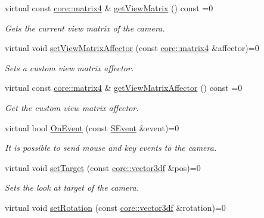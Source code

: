 \begin{DoxyCompactItemize}
virtual const \hyperlink{namespaceirr_1_1core_a73fa92e638c5ca97efd72da307cc9b65}{core\+::matrix4} \& \hyperlink{classirr_1_1scene_1_1ICameraSceneNode_aef40bb2f8f4a95a66dbb7fc3abee3e49}{get\+View\+Matrix} () const =0
\begin{DoxyCompactList}\small\item\em Gets the current view matrix of the camera. \end{DoxyCompactList}\item 
virtual void \hyperlink{classirr_1_1scene_1_1ICameraSceneNode_adb3500cac2a8a47e6a3f48aa343ce2fd}{set\+View\+Matrix\+Affector} (const \hyperlink{namespaceirr_1_1core_a73fa92e638c5ca97efd72da307cc9b65}{core\+::matrix4} \&affector)=0
\begin{DoxyCompactList}\small\item\em Sets a custom view matrix affector. \end{DoxyCompactList}\item 
virtual const \hyperlink{namespaceirr_1_1core_a73fa92e638c5ca97efd72da307cc9b65}{core\+::matrix4} \& \hyperlink{classirr_1_1scene_1_1ICameraSceneNode_a033018cccdb26f94cc33256e23d764c6}{get\+View\+Matrix\+Affector} () const =0
\begin{DoxyCompactList}\small\item\em Get the custom view matrix affector. \end{DoxyCompactList}\item 
virtual bool \hyperlink{classirr_1_1scene_1_1ICameraSceneNode_af27145518f43a17f803cdea086f68f3c}{On\+Event} (const \hyperlink{structirr_1_1SEvent}{S\+Event} \&event)=0
\begin{DoxyCompactList}\small\item\em It is possible to send mouse and key events to the camera. \end{DoxyCompactList}\item 
virtual void \hyperlink{classirr_1_1scene_1_1ICameraSceneNode_a7280b07fd7915c64350db5a132b4ba07}{set\+Target} (const \hyperlink{namespaceirr_1_1core_a06f169d08b5c429f5575acb7edbad811}{core\+::vector3df} \&pos)=0
\begin{DoxyCompactList}\small\item\em Sets the look at target of the camera. \end{DoxyCompactList}\item 
virtual void \hyperlink{classirr_1_1scene_1_1ICameraSceneNode_af95d5f50c192f212e11f3f050e92a470}{set\+Rotation} (const \hyperlink{namespaceirr_1_1core_a06f169d08b5c429f5575acb7edbad811}{core\+::vector3df} \&rotation)=0

\end{DoxyCompactItemize}
